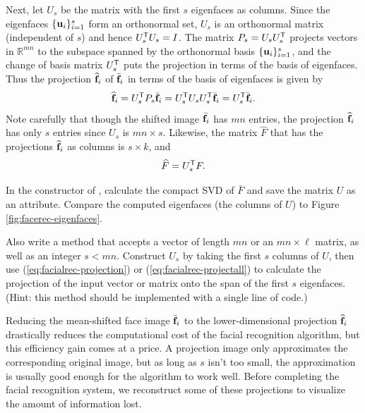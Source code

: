 Next, let $U_s$ be the matrix with the first $s$ eigenfaces as columns.
Since the eigenfaces $\{\mathbf{u}_i\}_{i=1}^s$ form an orthonormal set, $U_s$ is an orthonormal matrix (independent of $s$) and hence $U_s^{\mathsf T} U_s = I$.
The matrix $P_s = U_sU_s^{\mathsf T}$ projects vectors in $\mathbb{R}^{mn}$ to the subspace spanned by the orthonormal basis $\{\mathbf{u}_i\}_{i=1}^s$, and the change of basis matrix $U_s^{\mathsf T}$ puts the projection in terms of the basis of eigenfaces.
Thus the projection $\widehat{\mathbf{f}}_i$ of $\bar{\mathbf{f}}_i$ in terms of the basis of eigenfaces is given by
%
\begin{equation}
\widehat{\mathbf{f}}_i = U_s^{\mathsf T} P_s\bar{\mathbf{f}}_i = U_s^{\mathsf T} U_s U_s^{\mathsf T} \bar{\mathbf{f}}_i = U_s^{\mathsf T}\bar{\mathbf{f}}_i.
\label{eq:facialrec-projection}
\end{equation}
%
Note carefully that though the shifted image $\bar{\mathbf{f}_i}$ has $mn$ entries, the projection $\widehat{\mathbf{f}}_i$ has only $s$ entries since $U_s$ is $mn\times s$.
Likewise, the matrix $\widehat{F}$ that has the projections $\widehat{\mathbf{f}}_i$ as columns is $s \times k$, and
\begin{equation}
\widehat{F} = U_s^{\mathsf T} F.
\label{eq:facialrec-projectall}
\end{equation}

\begin{problem} %
In the constructor of , calculate the compact SVD of $\bar{F}$ and save the matrix $U$ as an attribute.
Compare the computed eigenfaces (the columns of $U$) to Figure \ref{fig:facerec-eigenfaces}.

Also write a method that accepts a vector of length $mn$ or an $mn\times \ell$ matrix, as well as an integer $s < mn$.
Construct $U_s$ by taking the first $s$ columns of $U$, then use (\ref{eq:facialrec-projection}) or (\ref{eq:facialrec-projectall}) to calculate the projection of the input vector or matrix onto the span of the first $s$ eigenfaces.
\\(Hint: this method should be implemented with a single line of code.)
\label{prob:facialrec-project}
\end{problem}

Reducing the mean-shifted face image $\bar{\mathbf{f}}_i$ to the lower-dimensional projection $\widehat{\mathbf{f}}_i$ drastically reduces the computational cost of the facial recognition algorithm, but this efficiency gain comes at a price.
A projection image only approximates the corresponding original image, but as long as $s$ isn't too small, the approximation is usually good enough for the algorithm to work well.
Before completing the facial recognition system, we reconstruct some of these projections to visualize the amount of information lost.

